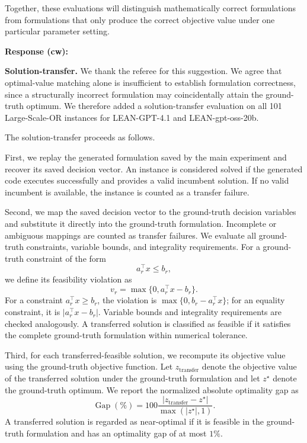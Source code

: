\documentclass[11pt]{article}
\begin{document}
\begin{enumerate}[label=(AssoE.\arabic*),leftmargin=*]
\begin{enumerate}[label=(R1.Major.\arabic*),leftmargin=*]
Together, these evaluations will distinguish mathematically correct
formulations from formulations that only produce the correct objective value
under one particular parameter setting.

\textbf{Response (cw):}

\noindent\textbf{Solution-transfer.}
We thank the referee for this suggestion. We agree that optimal-value matching alone is insufficient to establish formulation correctness, since a structurally incorrect formulation may coincidentally attain the ground-truth optimum. We therefore added a solution-transfer evaluation on all 101 Large-Scale-OR instances for LEAN-GPT-4.1 and LEAN-gpt-oss-20b.

The solution-transfer proceeds as follows.

First, we replay the generated formulation saved by the main experiment and recover its saved decision vector. An instance is considered solved if the generated code executes successfully and provides a valid incumbent solution. If no valid incumbent is available, the instance is counted as a transfer failure.

Second, we map the saved decision vector to the ground-truth decision variables and substitute it directly into the ground-truth formulation. Incomplete or ambiguous mappings are counted as transfer failures. We evaluate all ground-truth constraints, variable bounds, and integrality requirements. For a ground-truth constraint of the form
\[
a_r^\top x \leq b_r,
\]
we define its feasibility violation as
\[
v_r=\max\{0,a_r^\top x-b_r\}.
\]
For a constraint $a_r^\top x\geq b_r$, the violation is
$\max\{0,b_r-a_r^\top x\}$; for an equality constraint, it is
$\lvert a_r^\top x-b_r\rvert$.
Variable bounds and integrality requirements are checked analogously. A transferred solution is classified as feasible if it satisfies the complete ground-truth formulation within numerical tolerance.

Third, for each transferred-feasible solution, we recompute its objective value using the ground-truth objective function. Let $z_{\mathrm{transfer}}$ denote the objective value of the transferred solution under the ground-truth formulation and let $z^\star$ denote the ground-truth optimum. We report the normalized absolute optimality gap as
\[
\operatorname{Gap}(\%)
=
100
\frac{
\left|z_{\mathrm{transfer}}-z^\star\right|
}{
\max\left(\left|z^\star\right|,1\right)
}.
\]
A transferred solution is regarded as near-optimal if it is feasible in the ground-truth formulation and has an optimality gap of at most $1\%$.


\end{enumerate}
\end{enumerate}
\end{document}
